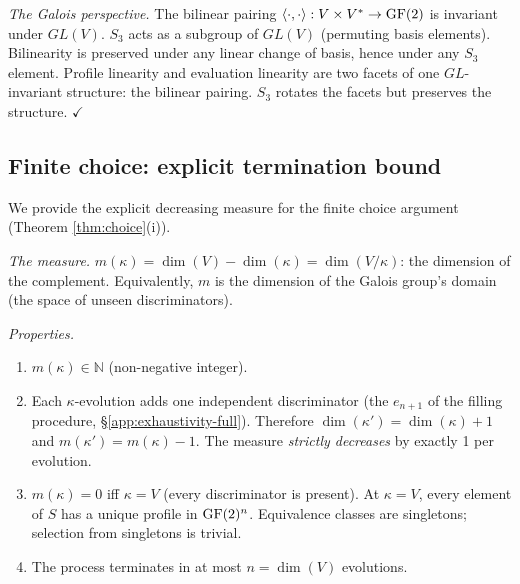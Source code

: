 \emph{The Galois perspective.}
The bilinear pairing $\langle \cdot, \cdot \rangle:
V \times V^* \to \operatorname{GF}(2)$ is invariant under $GL(V)$.
$S_3$ acts as a subgroup of $GL(V)$ (permuting basis
elements). Bilinearity is preserved under any linear
change of basis, hence under any $S_3$ element.
Profile linearity and evaluation linearity are two
facets of one $GL$-invariant structure: the bilinear
pairing. $S_3$ rotates the facets but preserves the
structure. $\checkmark$


\subsection{Finite choice: explicit termination bound}
\label{app:choice-termination}

We provide the explicit decreasing measure for the finite
choice argument (Theorem \ref{thm:choice}(i)).

\emph{The measure.}
$m(\kappa) = \dim(V) - \dim(\kappa) = \dim(V/\kappa)$:
the dimension of the complement. Equivalently, $m$ is
the dimension of the Galois group's domain (the space
of unseen discriminators).

\emph{Properties.}
\begin{enumerate}[label=(\roman*),nosep]
  \item $m(\kappa) \in \mathbb{N}$
    (non-negative integer).
  \item Each $\kappa$-evolution adds one independent
    discriminator (the $e_{n+1}$ of the filling procedure,
    \S\ref{app:exhaustivity-full}). Therefore
    $\dim(\kappa') = \dim(\kappa) + 1$ and
    $m(\kappa') = m(\kappa) - 1$. The measure
    \emph{strictly decreases} by exactly 1 per evolution.
  \item $m(\kappa) = 0$ iff $\kappa = V$ (every
    discriminator is present). At $\kappa = V$, every
    element of $S$ has a unique profile in $\operatorname{GF}(2)^n$.
    Equivalence classes are singletons; selection from
    singletons is trivial.
  \item The process terminates in at most $n = \dim(V)$
    evolutions.
\end{enumerate}


